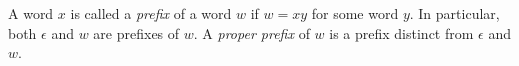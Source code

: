 

\setcounter{section}{2}
\setcounter{subsection}{2}
\setcounter{dfn}{8}

\begin{dfn}
A word $x$ is called a \emph{prefix} of a word $w$ if $w = xy$ for some word $y$.
In particular, both $\epsilon$ and $w$ are prefixes of $w$.
A \emph{proper prefix} of $w$ is a prefix distinct from $\epsilon$ and $w$.
\end{dfn}


